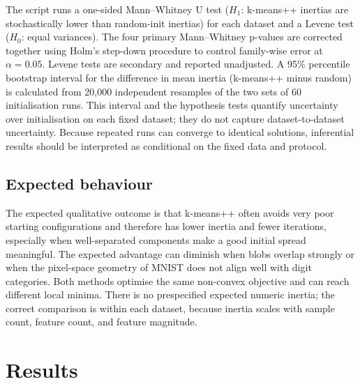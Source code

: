 \documentclass[10pt,a4paper]{article}
\begin{document}
The script runs a one-sided Mann--Whitney U test ($H_1$: k-means++ inertias are stochastically lower than random-init inertias) for each dataset and a Levene test ($H_0$: equal variances). The four primary Mann--Whitney p-values are corrected together using Holm's step-down procedure to control family-wise error at $\alpha=0.05$. Levene tests are secondary and reported unadjusted. A 95\% percentile bootstrap interval for the difference in mean inertia (k-means++ minus random) is calculated from 20,000 independent resamples of the two sets of 60 initialisation runs. This interval and the hypothesis tests quantify uncertainty over initialisation on each fixed dataset; they do not capture dataset-to-dataset uncertainty. Because repeated runs can converge to identical solutions, inferential results should be interpreted as conditional on the fixed data and protocol.

\subsection{Expected behaviour}
The expected qualitative outcome is that k-means++ often avoids very poor starting configurations and therefore has lower inertia and fewer iterations, especially when well-separated components make a good initial spread meaningful. The expected advantage can diminish when blobs overlap strongly or when the pixel-space geometry of MNIST does not align well with digit categories. Both methods optimise the same non-convex objective and can reach different local minima. There is no prespecified expected numeric inertia; the correct comparison is within each dataset, because inertia scales with sample count, feature count, and feature magnitude.

\section{Results}
\end{document}
